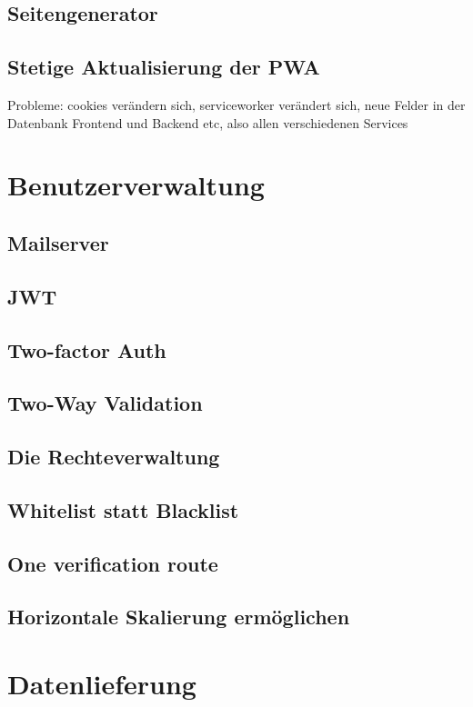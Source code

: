 \subsection{Seitengenerator}


\subsection{Stetige Aktualisierung der PWA}
Probleme: cookies verändern sich, serviceworker verändert sich, neue Felder in der Datenbank
Frontend und Backend etc, also allen verschiedenen Services

\section{Benutzerverwaltung}
\subsection{Mailserver}
\subsection{JWT}
\subsection{Two-factor Auth}
\subsection{Two-Way Validation}
\subsection{Die Rechteverwaltung}
\subsection{Whitelist statt Blacklist}
\subsection{One verification route}
\subsection{Horizontale Skalierung ermöglichen}


\section{Datenlieferung}

